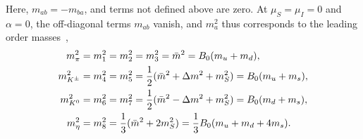%
Here, $m_{ab} = -m_{ba}$, and terms not defined above are zero.
At $\mu_S = \mu_I = 0$ and $\alpha = 0$, the off-diagonal terms $m_{ab}$ vanish, and $m_a^2$ thus corresponds to the leading order masses~\autocite{eckerChiralPerturbationTheory1995},
%
\begin{align}
    m_\pi^2 & = m_1^2 = m_2^2 = m_3^2 = \bar m^2 = B_0(m_u + m_d), \\
    m_{{K^\pm}}^2 & = m_4^2 = m_5^2 = \frac{1}{2} (\bar m^2 + \Delta m^2 + m_S^2) = B_0(m_u + m_s), \\
    m_{{K^0} }^2 & = m_6^2 = m_7^2 = \frac{1}{2} (\bar m^2 - \Delta m^2 + m_S^2) = B_0(m_d + m_s), \\
    m_\eta^2 & = m_8^2 = \frac{1}{3}(\bar m^2  + 2m_S^2) = \frac{1}{3}B_0(m_u + m_d + 4m_s).
\end{align}
%


